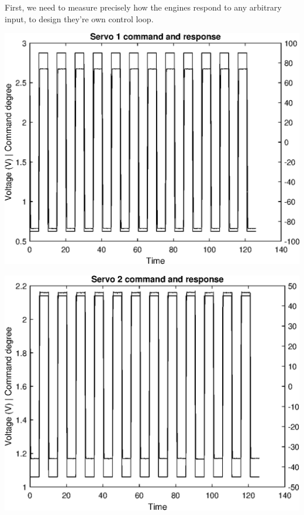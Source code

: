 First, we need to measure precisely how the engines respond to any arbitrary input, to design they're own control loop.

\includegraphics[width=\SchematicWidth]{images/Servos/full-square.eps}

\includegraphics[width=\SchematicWidth]{images/Servos/reduced-square.eps}

